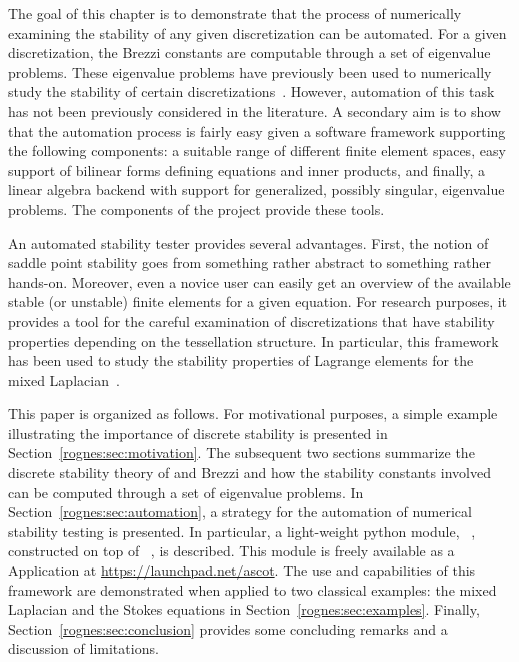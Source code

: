 The goal of this chapter is to demonstrate that the process of
numerically examining the stability of any given discretization can be
automated. For a given discretization, the Brezzi constants are
computable through a set of eigenvalue problems. These eigenvalue
problems have previously been used to numerically study the stability
of certain discretizations~\citep{ArnoldRognes2009, ChapelleBathe1993,
  Qin1994}. However, automation of this task has not been previously
considered in the literature. A secondary aim is to show that the
automation process is fairly easy given a software framework
supporting the following components: a suitable range of different
finite element spaces, easy support of bilinear forms defining
equations and inner products, and finally, a linear algebra backend
with support for generalized, possibly singular, eigenvalue
problems. The components of the \fenics{} project
provide these tools.

An automated stability tester provides several advantages. First, the
notion of saddle point stability goes from something rather abstract
to something rather hands-on. Moreover, even a novice user can easily
get an overview of the available stable (or unstable) finite elements
for a given equation. For research purposes, it provides a tool for
the careful examination of discretizations that have stability
properties depending on the tessellation structure. In particular,
this framework has been used to study the stability properties of
Lagrange elements for the mixed Laplacian~\citep{ArnoldRognes2009}.

This paper is organized as follows. For motivational purposes, a
simple example illustrating the importance of discrete stability is
presented in Section~\ref{rognes:sec:motivation}. The subsequent two
sections summarize the discrete stability theory of \babuska{} and
Brezzi and how the stability constants involved can be computed
through a set of eigenvalue problems. In
Section~\ref{rognes:sec:automation}, a strategy for the automation of
numerical stability testing is presented. In particular, a
light-weight python module, \rognesascot{}~\citep{Rognes2009},
constructed on top of \pydolfin{}~\citep{LoggWells2010}, is
described. This module is freely available as a \fenics{} Application
at \url{https://launchpad.net/ascot}. The use and capabilities of this
framework are demonstrated when applied to two classical examples: the
mixed Laplacian and the Stokes equations in
Section~\ref{rognes:sec:examples}. Finally,
Section~\ref{rognes:sec:conclusion} provides some concluding remarks
and a discussion of limitations.

